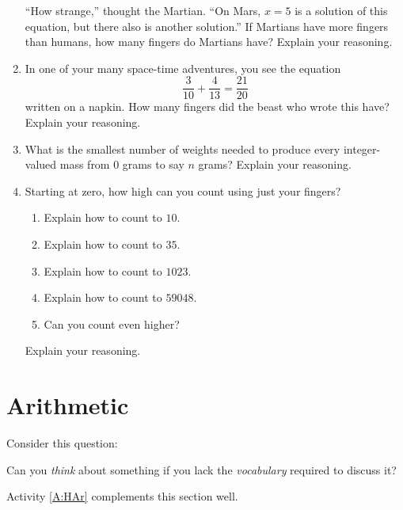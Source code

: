 \begin{problems}
\begin{enumerate}
``How strange,'' thought the Martian. ``On Mars, $x = 5$ is a solution
of this equation, but there also is another solution.'' If Martians
have more fingers than humans, how many fingers do Martians have?
Explain your reasoning.


\item In one of your many space-time adventures, you see the equation
\[
\frac{3}{10} + \frac{4}{13} = \frac{21}{20}
\]
written on a napkin. How many fingers did the beast who wrote this
have? Explain your reasoning.
\item What is the smallest number of weights needed to produce every
  integer-valued mass from $0$ grams to say $n$ grams? Explain your
  reasoning.
\item Starting at zero, how high can you count using just your
  fingers?
\begin{enumerate}
\item Explain how to count to $10$.
\item Explain how to count to $35$.
\item Explain how to count to $1023$.
\item Explain how to count to $59048$.
\item Can you count even higher?
\end{enumerate}
Explain your reasoning.
\end{enumerate}

\end{problems}








\section{Arithmetic}\label{S:aritmetic}


Consider this question:

\begin{question}
Can you \textit{think} about something if you lack the
\textit{vocabulary} required to discuss it?
\end{question}
\QM


\begin{activitynote}
Activity \ref{A:HAr} complements this section well.  %
\end{activitynote}


